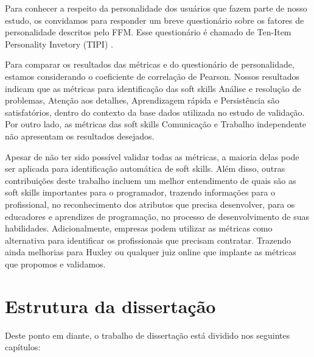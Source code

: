 Para conhecer a respeito da personalidade dos usuários que fazem parte de nosso estudo, os convidamos para responder um breve questionário sobre os fatores de personalidade descritos pelo FFM. Esse questionário é chamado de Ten-Item Personality Invetory (TIPI) \cite{gosling:03}.

Para comparar os resultados das métricas e do questionário de personalidade, estamos considerando o coeficiente de correlação de Pearson. Nossos resultados indicam que as métricas para identificação das soft skills Análise e resolução de problemas, Atenção aos detalhes, Aprendizagem rápida e Persistência são satisfatórios, dentro do contexto da base dados utilizada no estudo de validação. Por outro lado, as métricas das soft skills Comunicação e Trabalho independente não apresentam os resultados desejados. 

Apesar de não ter sido possível validar todas as métricas, a maioria delas pode ser aplicada para identificação automática de soft skills. Além disso, outras contribuições deste trabalho incluem um melhor entendimento de quais são as soft skills importantes para o programador, trazendo informações para o profissional, no reconhecimento dos atributos que precisa desenvolver, para os educadores e aprendizes de programação, no processo de desenvolvimento de suas habilidades. Adicionalmente, empresas podem utilizar as métricas como alternativa para identificar os profissionais que precisam contratar. Trazendo ainda melhorias para Huxley ou qualquer juiz online que implante as métricas que propomos e validamos.

\section{Estrutura da dissertação}

Deste ponto em diante, o trabalho de dissertação está dividido nos seguintes capítulos:

